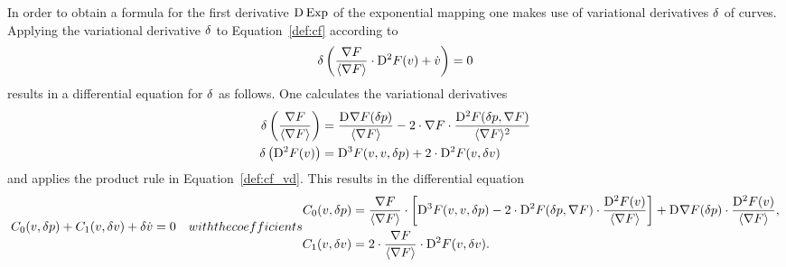 In order to obtain a formula for the first derivative $ \mathrm{D}^{  } \operatorname{Exp}  $
of the exponential mapping one makes use
of variational derivatives $ \delta $ of curves.
Applying the variational derivative $ \delta $
to Equation~\eqref{def:cf} according to
\begin{align}
    \delta \left(
    \frac{ \nabla F }{ \langle  \nabla F  \rangle } \cdot \mathrm{D}^{ 2 }F( v )
    +
    \dot{ v }
    \right)
    =
    0
    \label{def:cf_vd}
\end{align}
results in a differential equation for $ \delta $ as follows.
One calculates the variational derivatives
\begin{subequations}
    \begin{align}
    \delta \left( \frac{ \nabla F  }{ \langle  \nabla F   \rangle } \right)
    &=
    \frac{ \mathrm{D}^{  } \nabla F  ( \delta p ) }{ \langle  \nabla F   \rangle }  -
    2 \cdot \nabla F  \cdot
    \frac{ \mathrm{D}^{  2  } F ( \delta p, \nabla F  ) }{ \langle  \nabla F   \rangle^2 }
    \\
    \delta\left( \mathrm{D}^{  2  } F ( v ) \right)
    &=
    \mathrm{D}^{  3  } F ( v, v, \delta p )  +
    2 \cdot \mathrm{D}^{  2  } F ( v, \delta v )
    \end{align}
\end{subequations}
and applies the product rule in Equation~\eqref{def:cf_vd}.
This results in the differential equation
\begin{subequations}
    \label{def:cf_vd_dgl}
    \begin{align}
        C_0( v, \vardiff p )  +  C_1( v, \vardiff v )  +  \vardiff \dot{ v }
        &=
        0
        \label{def:cf_vd_dgl:a}
    \end{align}
    with the coefficients
    \begin{align}
        C_0( v, \vardiff p )
        &=
        \frac{ \grad{F} }{ \skaq{ \grad{F} } } \mult
        \left[  \diff{3}{F}( v, v, \vardiff p )  -
        2 \mult \diff{2}{F}( \vardiff p, \grad{F} ) \mult
        \frac{ \diff{2}{F}( v ) }{ \skaq{\grad{F}} }  \right]  +
        \diff{}{\grad{F}}( \vardiff p ) \mult
        \frac{ \diff{2}{F}( v ) }{ \skaq{\grad{F}} } ,
        \label{def:cf_vd_dgl:b}
        \\
        C_1( v, \vardiff v )
        &=
        2 \mult \frac{ \grad{F} }{ \skaq{ \grad{F} } }  \mult
        \diff{2}{F}( v, \vardiff v ) .
        \label{def:cf_vd_dgl:c}
    \end{align}
\end{subequations}


